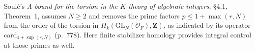 Soulé's \emph{A bound for the torsion in the \(K\)-theory of algebraic
integers}, \S4.1, Theorem~1, assumes \(N\ge2\) and removes the prime
factors \(p\le1+\max(r,N)\) from the order of the torsion in \(H_k(\mathrm{GL}_N(\mathcal O_F),\mathbf Z)\), as indicated by its operator \(\mathrm{card}_{1+\sup(r,N)}\) (p.~778). Here finite stabilizer homology provides integral
control at those primes as well. \cite{r21-soule}

